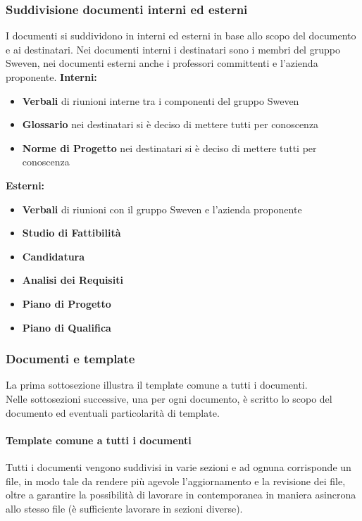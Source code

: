 \subsubsection{Suddivisione documenti interni ed esterni}
I documenti si suddividono in interni ed esterni in base allo scopo del documento e ai destinatari.
Nei documenti interni i destinatari sono i membri del gruppo Sweven, nei documenti esterni anche i 
professori committenti e l'azienda proponente. \newline
\textbf{Interni:}
\begin{itemize}
    \item \textbf{Verbali} di riunioni interne tra i componenti del gruppo Sweven
    \item \textbf{Glossario} nei destinatari si è deciso di mettere tutti per conoscenza
    \item \textbf{Norme di Progetto} nei destinatari si è deciso di mettere tutti per conoscenza
\end{itemize}

\textbf{Esterni:}
\begin{itemize}
    \item \textbf{Verbali} di riunioni con il gruppo Sweven e l'azienda proponente
    \item \textbf{Studio di Fattibilità}
    \item \textbf{Candidatura}
    \item \textbf{Analisi dei Requisiti}
    \item \textbf{Piano di Progetto}
    \item \textbf{Piano di Qualifica}
\end{itemize}

\subsubsection{Documenti e template}
La prima sottosezione illustra il template comune a tutti i documenti.\\
Nelle sottosezioni successive, una per ogni documento, è scritto lo scopo 
del documento ed eventuali particolarità di template.
\paragraph{Template comune a tutti i documenti} \hfill \break
Tutti i documenti vengono suddivisi in varie sezioni e ad ognuna corrisponde 
un file, in modo tale da rendere più agevole l'aggiornamento e la revisione dei file, 
oltre a garantire la possibilità di lavorare in contemporanea in maniera 
asincrona allo stesso file (è sufficiente lavorare in sezioni diverse).

